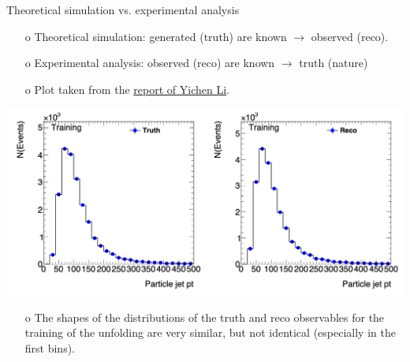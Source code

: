 \begin{frame} {Theoretical simulation vs. experimental analysis}
\begin{enumerate}
\item[o] Theoretical simulation: generated (truth) are known $\rightarrow$ observed (reco).
\item[o] Experimental analysis: observed (reco) are known $\rightarrow$ truth (nature)
\item[o] Plot taken from the \href{http://www.desy.de/~liyichen/Unfolding.pdf}{report of Yichen Li}. 
\end{enumerate}
\centering
\includegraphics[height=0.48\textheight]{./plots/jetPt_truth_reco.png}
\begin{enumerate}
\item[o] The shapes of the distributions of the truth and reco observables for the training of the unfolding are very similar, but not identical (especially in the first bins). 
\end{enumerate}
\end{frame}
\clearpage


